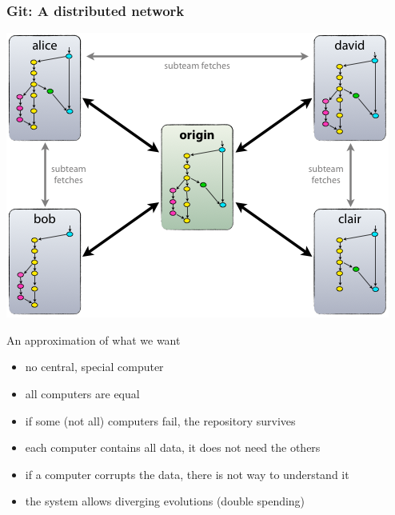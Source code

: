 \documentclass[11pt]{beamer}  %
\begin{document}
\begin{frame}
\end{frame}

\begin{frame}\frametitle{Git: A distributed network}

  \begin{center}
    \includegraphics[scale=0.26,clip=false]{pictures/git_distributed.png}
  \end{center}

  \begin{greenbox}{An approximation of what we want}
    \begin{itemize}
    \item no central, special computer
    \item all computers are equal
    \item if some (not all) computers fail, the repository survives
    \item each computer contains all data, it does not need the others
    \item {\color{red}if a computer corrupts the data, there is not way to understand it}
    \item {\color{red}the system allows diverging evolutions (double spending)}
    \end{itemize}
  \end{greenbox}
  
\end{frame}
\end{document}
